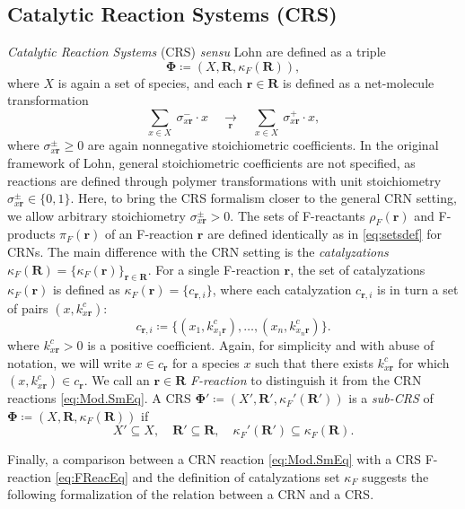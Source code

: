 \documentclass[pdflatex]{sn-jnl}
\theoremstyle{thmstyleone}%
\theoremstyle{examplesty}%
\theoremstyle{thmstylethree}%
\newcommand{\FR}[0]{\mathbf{R}}
\newcommand{\fr}[0]{\mathbf{r}}
\newcommand{\cat}{\kappa_F}
\newcommand{\feducts}{\rho_F}
\newcommand{\fproducts}{\pi_F}
\begin{document}
\subsection{Catalytic Reaction Systems (CRS)}\label{sec:CRS}

\emph{Catalytic Reaction Systems} (CRS) \textit{sensu} 
Lohn \cite{lohn_evolving_1998} are defined as a triple 
\begin{equation}\mathbf{\Phi}\coloneqq (X, \FR, \cat(\FR)),
\end{equation}
where $X$ is again a set of species, and each $\fr\in\FR$ is defined as a
net-molecule transformation
\begin{equation}\label{eq:FReacEq}
  \sum_{x\in X}\ \sigma^-_{x\fr} \cdot x \quad
  \underset{\fr}\longrightarrow \quad
  \sum_{x\in X}\ \sigma^+_{x\fr} \cdot x,
\end{equation}
where $\sigma^\pm_{x\fr}\ge 0$ are again nonnegative stoichiometric
coefficients. In the original framework of Lohn, general stoichiometric 
coefficients are not specified, as reactions are defined through polymer 
transformations with unit stoichiometry $\sigma^\pm_{x\fr}\in \{0,1\}$. 
Here, to bring the CRS formalism closer to the general CRN setting, 
we allow arbitrary stoichiometry $\sigma^\pm_{x\fr}>0$. 
The sets of F-reactants $\feducts(\fr)$ and F-products
$\fproducts(\fr)$ of an F-reaction $\fr$ are defined identically as in
\eqref{eq:setsdef} for CRNs. The main difference with the CRN setting is
the \emph{catalyzations} $\cat(\FR)=\{ \cat(\fr) \}_{\fr\in\FR}$.  For a
single F-reaction $\fr$, the set of catalyzations $\cat(\fr)$ is defined as
$\cat(\fr)=\{c_{\fr,i}\}$, where each catalyzation $c_{\fr,i}$ is in turn a set of
pairs $(x,k^{c}_{x\mathbf{r}})$:
\begin{equation}\label{eq:CatCFR}
    c_{\fr,i}\coloneqq \{(x_1,k^c_{x_1\mathbf{r}}),\ldots, (x_n,k^c_{x_n\fr})\}.
\end{equation}
where $k^{c}_{x\fr}>0$ is a positive coefficient. Again, for simplicity and
with abuse of notation, we will write $x\in c_\fr$ for a species $x$ such
that there exists $k^c_{x\fr}$ for which $(x,k^c_{x\fr})\in c_{\fr}$.  We
call an $\fr\in \FR$ \emph{F-reaction} to distinguish it from the CRN
reactions \eqref{eq:Mod.SmEq}. A CRS
$\mathbf{\Phi}'\coloneqq (X', \FR', \cat'(\FR'))$ is a \emph{sub-CRS} of
$\mathbf{\Phi}\coloneqq (X, \FR, \cat(\FR))$ if \[X'\subseteq X,\quad
\FR'\subseteq\FR,\quad \cat'(\FR')\subseteq \cat(\FR).\]

Finally, a comparison between a CRN reaction \eqref{eq:Mod.SmEq} with a CRS
F-reaction \eqref{eq:FReacEq} and the definition of catalyzations set
$\cat$ suggests the following formalization of the relation between a CRN
and a CRS.
\end{document}
